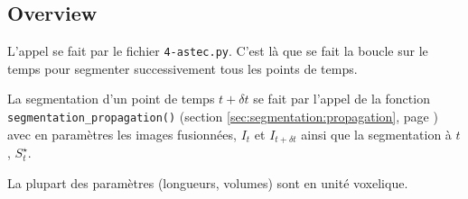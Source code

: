 \documentclass{article}
\begin{document}
\subsection{Overview}

L'appel se fait par le fichier \texttt{4-astec.py}. C'est l\`a que se fait la boucle sur le temps pour segmenter successivement tous les points de temps. 

La segmentation d'un point de temps $t + \delta t$ se fait par l'appel de la fonction \texttt{segmentation\_propagation()} (section \ref{sec:segmentation:propagation}, page \pageref{sec:segmentation:propagation}) avec en param\`etres les images fusionn\'ees, $I_{t}$ et $I_{t + \delta t}$ ainsi que la segmentation \`a $t$, $S^{\star}_t$.

La plupart des param\`etres (longueurs, volumes) sont en unit\'e voxelique.
\end{document}
